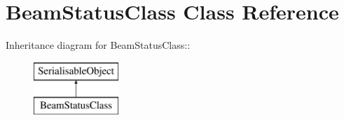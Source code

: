 \hypertarget{classBeamStatusClass}{
\section{BeamStatusClass Class Reference}
\label{classBeamStatusClass}
}
Inheritance diagram for BeamStatusClass::\begin{figure}[H]
\begin{center}
\leavevmode
\includegraphics[height=2cm]{classBeamStatusClass}
\end{center}
\end{figure}
